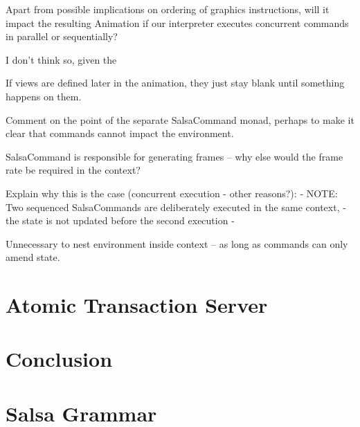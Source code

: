\documentclass[
paper=a4,
oneside,
fontsize=11pt,
numbers=noenddot,
headinclude=false, %
footinclude=false, %
fleqn,             %
DIV=8
]{scrartcl}
\begin{document}
Apart from possible implications on ordering of graphics instructions, will it
impact the resulting Animation if our interpreter executes concurrent commands
in parallel or sequentially?

I don't think so, given the 

If views are defined later in the animation, they just stay blank until
something happens on them.

Comment on the point of the separate SalsaCommand monad, perhaps to make it
clear that commands cannot impact the environment.

SalsaCommand is responsible for generating frames -- why else would the frame
rate be required in the context?

Explain why this is the case (concurrent execution - other reasons?):
{- NOTE: Two sequenced SalsaCommands are deliberately executed in the same context,
 - the state is not updated before the second execution -}

Unnecessary to nest environment inside context -- as long as commands can only
amend state.

\section{Atomic Transaction Server}

\section{Conclusion}





\appendix

\section{Salsa Grammar}
\end{document}
